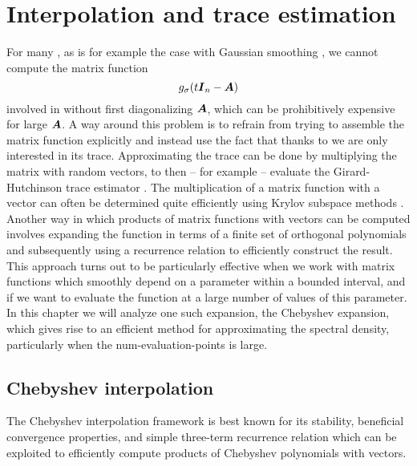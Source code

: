 \chapter{Interpolation and trace estimation}
\label{chp:2-chebyshev}

For many , as is for example the case with Gaussian smoothing
, we cannot compute the matrix function
\begin{equation}
    g_{\sigma}(t\boldsymbol{I}_n - \boldsymbol{A})
    \label{equ:2-chebyshev-matrix-function}
\end{equation}
involved in  without first
diagonalizing $\boldsymbol{A}$, which can be prohibitively expensive for large
$\boldsymbol{A}$. A way around this problem is to refrain from trying to assemble the
matrix function explicitly and instead use the fact that thanks to
 we are only interested
in its trace. Approximating the trace can be done by multiplying the matrix
with random vectors, to then -- for example -- evaluate the Girard-Hutchinson trace estimator \cite{hutchinson1990trace}.
The multiplication of a matrix function with a vector can
often be determined quite efficiently using Krylov subspace methods
\cite[chapter~13.2]{higham2008functions}. Another way in which products of matrix
functions with vectors can be computed involves
expanding the function in terms of a finite set of orthogonal polynomials
and subsequently using a recurrence relation to efficiently construct the result.
This approach turns out to be particularly effective when we work with matrix
functions which smoothly depend on a parameter within a bounded interval, and if we
want to evaluate the function at a large number of values of this parameter.
In this chapter we will analyze one such expansion, the Chebyshev expansion,
which gives rise to an efficient method for approximating the spectral density,
particularly when the \gls{num-evaluation-points} is large.


\section{Chebyshev interpolation}
\label{sec:2-chebyshev-interpolation}

The Chebyshev interpolation framework is best known for its stability, beneficial
convergence properties, and simple three-term recurrence relation
 which can
be exploited to efficiently compute products of Chebyshev polynomials with
vectors.\\

